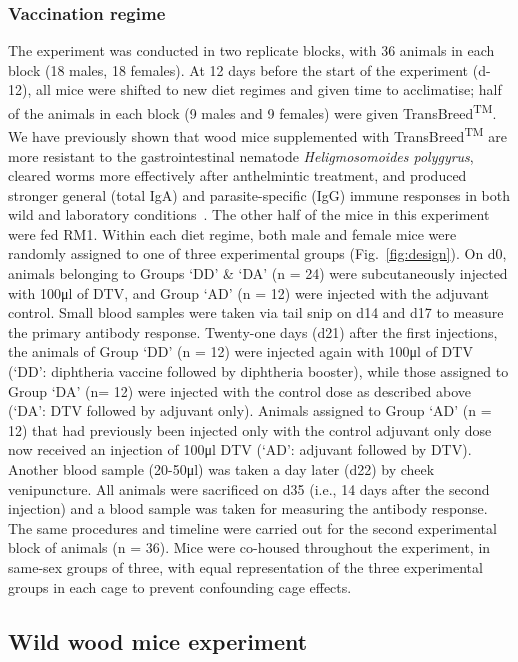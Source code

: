 \documentclass[a4paper, hidelinks, 11pt]{article}
\begin{document}
\subsubsection{Vaccination regime}
The experiment was conducted in two replicate blocks, with 36 animals in each block (18 males, 18 females). At 12 days before the start of the experiment (d-12), all mice were shifted to new diet regimes and given time to acclimatise; half of the animals in each block (9 males and 9 females) were given TransBreed\textsuperscript{TM}. We have previously shown that wood mice supplemented with TransBreed\textsuperscript{TM} are more resistant to the gastrointestinal nematode \textit{Heligmosomoides polygyrus}, cleared worms more effectively after anthelmintic treatment, and produced stronger general (total IgA) and parasite-specific (IgG) immune responses in both wild and laboratory conditions~\cite{Sweeny2021}. The other half of the mice in this experiment were fed RM1. Within each diet regime, both male and female mice were randomly assigned to one of three experimental groups (Fig.~\ref{fig:design}). On d0, animals belonging to Groups `DD' \& `DA' (n = 24) were subcutaneously injected with 100μl of DTV, and Group `AD' (n = 12) were injected with the adjuvant control. Small blood samples were taken via tail snip on d14 and d17 to measure the primary antibody response. Twenty-one days (d21) after the first injections, the animals of Group `DD' (n = 12) were injected again with 100μl of DTV (`DD': diphtheria vaccine followed by diphtheria booster), while those assigned to Group `DA' (n= 12) were injected with the control dose as described above (`DA': DTV followed by adjuvant only). Animals assigned to Group `AD' (n = 12) that had previously been injected only with the control adjuvant only dose now received an injection of 100μl DTV (`AD': adjuvant followed by DTV). Another blood sample (20-50μl) was taken a day later (d22) by cheek venipuncture. All animals were sacrificed on d35 (i.e., 14 days after the second injection) and a blood sample was taken for measuring the antibody response. The same procedures and timeline were carried out for the second experimental block of animals (n = 36). Mice were co-housed throughout the experiment, in same-sex groups of three, with equal representation of the three experimental groups in each cage to prevent confounding cage effects.

\subsection{Wild wood mice experiment}
\end{document}
